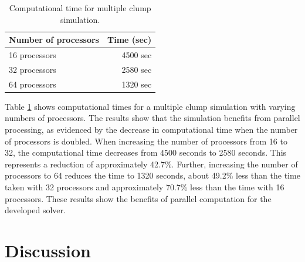 \begin{table}[H]
    \centering
    \caption{Computational time for multiple clump simulation.} \label{table4-chap4}
    \begin{tabular}{lr}
        \toprule
        \hline
       Number of processors     & Time (sec)\\
        \hline
        \midrule
        16 processors &  4500 sec \\
        32 processors &   2580 sec\\
        64 processors &   1320 sec\\
                                \hline
        \bottomrule
     \end{tabular}
\end{table}
Table \ref{table4-chap4} shows computational times for a multiple clump simulation with varying numbers of processors. The results show that the simulation benefits from parallel processing, as evidenced by the decrease in computational time when the number of processors is doubled. When increasing the number of processors from 16 to 32, the computational time decreases from 4500 seconds to 2580 seconds. This represents a reduction of approximately 42.7\%. Further, increasing the number of processors to 64 reduces the time to 1320 seconds, about 49.2\% less than the time taken with 32 processors and approximately 70.7\% less than the time with 16 processors. These results show the benefits of parallel computation for the developed solver.

\section{Discussion}


